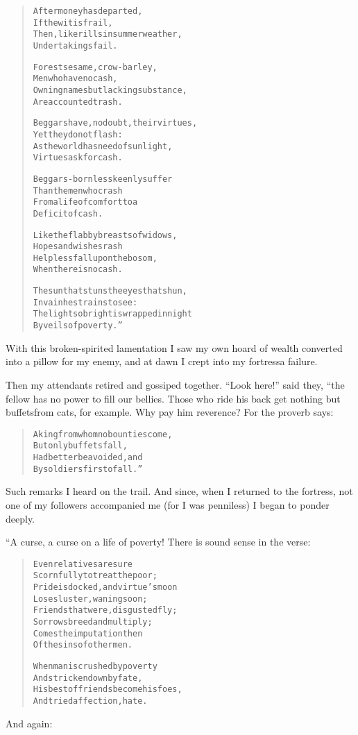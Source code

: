 \documentclass[article, twoside, 14pt]{memoir}
\renewenvironment{verbatim}{%
\begin{quote}%
\vskip -10pt%
\begin{alltt}\normalfont\large}{\end{alltt}%
\end{quote}%
\vskip -10pt
} %
\begin{document}
\begin{verbatim}
After money has departed,
    If the wit is frail,
Then, like rills in summer weather,
    Undertakings fail.

Forest sesame, crow-barley,
    Men who have no cash,
Owning names but lacking substance,
    Are accounted trash.

Beggars have, no doubt, their virtues,
    Yet they do not flash:
As the world has need of sunlight,
    Virtues ask for cash.

Beggars-born less keenly suffer
    Than the men who crash
From a life of comfort to a
    Deficit of cash.

Like the flabby breasts of widows,
    Hopes and wishes rash
Helpless fall upon the bosom,
    When there is no cash.

The sun that stuns the eyes that shun,
    In vain he strains to see:
The light so bright is wrapped in night
    By veils of poverty.”
\end{verbatim}
With this broken-spirited lamentation I saw my own hoard of wealth
converted into a pillow for my enemy, and at dawn I crept into my
fortress{\textemdash}a failure.

Then my attendants retired and gossiped together. ``Look here!''
said they, “the fellow has no power to fill our bellies. Those who
ride his back get nothing but buffets{\textemdash}from cats, for
example. Why pay him reverence? For the proverb says:

\begin{verbatim}
A king from whom no bounties come,
    But only buffets fall,
Had better be avoided, and
    By soldiers first of all.”
\end{verbatim}
Such remarks I heard on the trail. And since, when I returned to
the fortress, not one of my followers accompanied me (for I was
penniless) I began to ponder deeply.

“A curse, a curse on a life of poverty! There is sound sense in the
verse:

\begin{verbatim}
Even relatives are sure
Scornfully to treat the poor;
Pride is docked, and virtue's moon
Loses luster, waning soon;
Friends that were, disgusted fly;
Sorrows breed and multiply;
Comes the imputation then
Of the sins of other men.

When man is crushed by poverty
    And stricken down by fate,
His best of friends become his foes,
    And tried affection, hate.
\end{verbatim}
And again:
\end{document}
